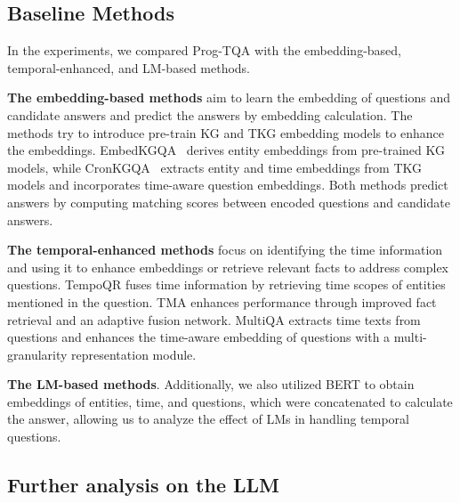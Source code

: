 \documentclass[10pt, a4paper]{article}
\begin{document}
\subsection{Baseline Methods}\label{app:baseline}
In the experiments, we compared Prog-TQA with the embedding-based, temporal-enhanced, and LM-based methods.

\textbf{The embedding-based methods} aim to learn the embedding of questions and candidate answers and predict the answers by embedding calculation. The methods try to introduce pre-train KG and TKG embedding models \cite{zhang2023weighted, lacroix2019tensor} to enhance the embeddings. EmbedKGQA~\cite{saxena2020improving} derives entity embeddings from pre-trained KG models, while CronKGQA~\cite{saxena2021question} extracts entity and time embeddings from TKG models and incorporates time-aware question embeddings. Both methods predict answers by computing matching scores between encoded questions and candidate answers.

\textbf{The temporal-enhanced methods} focus on identifying the time information and using it to enhance embeddings or retrieve relevant facts to address complex questions. TempoQR\cite{mavromatis2022tempoqr} fuses time information by retrieving time scopes of entities mentioned in the question. TMA\cite{liu2023time} enhances performance through improved fact retrieval and an adaptive fusion network.  MultiQA\cite{chen2023multi} extracts time texts from questions and enhances the time-aware embedding of questions with a multi-granularity representation module.

\textbf{The LM-based methods}. Additionally, we also utilized BERT\cite{kenton2019bert} to obtain embeddings of entities, time, and questions, which were concatenated to calculate the answer, allowing us to analyze the effect of LMs in handling temporal questions.

\subsection{Further analysis on the LLM}\label{app:llm}
\end{document}
